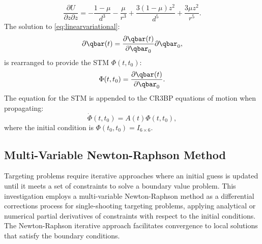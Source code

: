 \vspace{1mm}
\begin{equation}
    \frac{\partial U}{\partial z\partial z}=-\frac{1-\mu}{d^{3}}-\frac{\mu}{r^{3}}+\frac{3(1-\mu)z^{2}}{d^{5}}+\frac{3\mu z^{2}}{r^{5}}.
    \label{eq:partialUpartialzz}
\end{equation}
The solution to \cref{eq:linearvariational}:
\begin{equation}
    \partial\qbar(t)=\frac{\partial\qbar(t)}{\partial\qbar_{0}}\partial\qbar_{0},
    \label{eq:variationalsolution}
\end{equation}
is rearranged to provide the STM $\Phi(t,t_{0})$:
\begin{equation}
    \Phi(t,t_{0})=\frac{\partial\qbar(t)}{\partial\qbar_{{0}}}.
    \label{eq:STM}
\end{equation}
The equation for the STM is appended to the CR3BP equations of motion when propagating:
\begin{equation}
    \dot{\Phi}(t,t_{0})=A(t)\Phi(t,t_{0}),
    \label{eq:STMEoM}
\end{equation}
where the initial condition is $\Phi(t_{0},t_{0})=I_{6\times6}$.

\subsection{Multi-Variable Newton-Raphson Method}
Targeting problems require iterative approaches where an initial guess is updated until it meets a
set of constraints to solve a boundary value problem. This investigation employs a multi-variable
Newton-Raphson method as a differential corrections process for single-shooting targeting problems,
applying analytical or numerical partial derivatives of constraints with respect to the initial
conditions. The Newton-Raphson iterative approach facilitates convergence to local solutions that
satisfy the boundary conditions.

